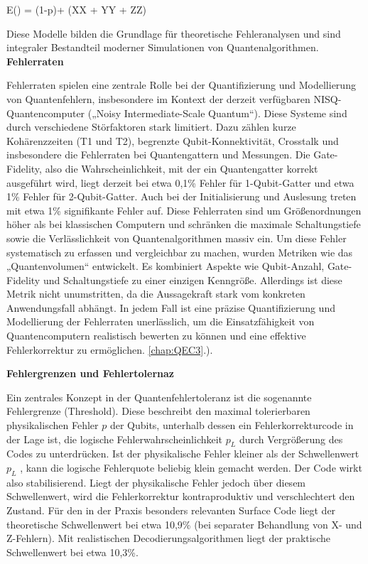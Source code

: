 E(\rho) = (1-p)\rho + (X\rho X + Y\rho Y + Z\rho Z)


Diese Modelle bilden die Grundlage für theoretische Fehleranalysen und sind integraler Bestandteil moderner Simulationen von Quantenalgorithmen.\cite[Seite 379-397]{nielsen_quantum_2010}\\


\textbf{Fehlerraten}

Fehlerraten spielen eine zentrale Rolle bei der Quantifizierung und Modellierung von Quantenfehlern, insbesondere im Kontext der derzeit verfügbaren NISQ-Quantencomputer („Noisy Intermediate-Scale Quantum“). Diese Systeme sind durch verschiedene Störfaktoren stark limitiert. Dazu zählen kurze Kohärenzzeiten (T1 und T2), begrenzte Qubit-Konnektivität, Crosstalk und insbesondere die Fehlerraten bei Quantengattern und Messungen. Die Gate-Fidelity, also die Wahrscheinlichkeit, mit der ein Quantengatter korrekt ausgeführt wird, liegt derzeit bei etwa 0,1\% Fehler für 1-Qubit-Gatter und etwa 1\% Fehler für 2-Qubit-Gatter. Auch bei der Initialisierung und Auslesung treten mit etwa 1\% signifikante Fehler auf. Diese Fehlerraten sind um Größenordnungen höher als bei klassischen Computern und schränken die maximale Schaltungstiefe sowie die Verlässlichkeit von Quantenalgorithmen massiv ein. Um diese Fehler systematisch zu erfassen und vergleichbar zu machen, wurden Metriken wie das „Quantenvolumen“ entwickelt. Es kombiniert Aspekte wie Qubit-Anzahl, Gate-Fidelity und Schaltungstiefe zu einer einzigen Kenngröße. Allerdings ist diese Metrik nicht unumstritten, da die Aussagekraft stark vom konkreten Anwendungsfall abhängt. In jedem Fall ist eine präzise Quantifizierung und Modellierung der Fehlerraten unerlässlich, um die Einsatzfähigkeit von Quantencomputern realistisch bewerten zu können und eine effektive Fehlerkorrektur zu ermöglichen. \ref{chap:QEC3}.). \cite[Seite 379-397]{https://www.quantencomputer-info.de/quantencomputer/welche-quantencomputer-gibt-es-jetzt-schon/}


\textbf{Fehlergrenzen und Fehlertolernaz}

Ein zentrales Konzept in der Quantenfehlertoleranz ist die sogenannte Fehlergrenze (Threshold). Diese beschreibt den maximal tolerierbaren physikalischen Fehler \( p \) der Qubits, unterhalb dessen ein Fehlerkorrekturcode in der Lage ist, die logische Fehlerwahrscheinlichkeit 
\( p_{L} \) 
durch Vergrößerung des Codes zu unterdrücken. Ist der physikalische Fehler kleiner als der Schwellenwert \( p_{L} \) , kann die logische Fehlerquote beliebig klein gemacht werden. Der Code wirkt also stabilisierend. Liegt der physikalische Fehler jedoch über diesem Schwellenwert, wird die Fehlerkorrektur kontraproduktiv und verschlechtert den Zustand. Für den in der Praxis besonders relevanten Surface Code liegt der theoretische Schwellenwert bei etwa 10,9\% (bei separater Behandlung von X- und Z-Fehlern). Mit realistischen Decodierungsalgorithmen liegt der praktische Schwellenwert bei etwa 10,3\%.


